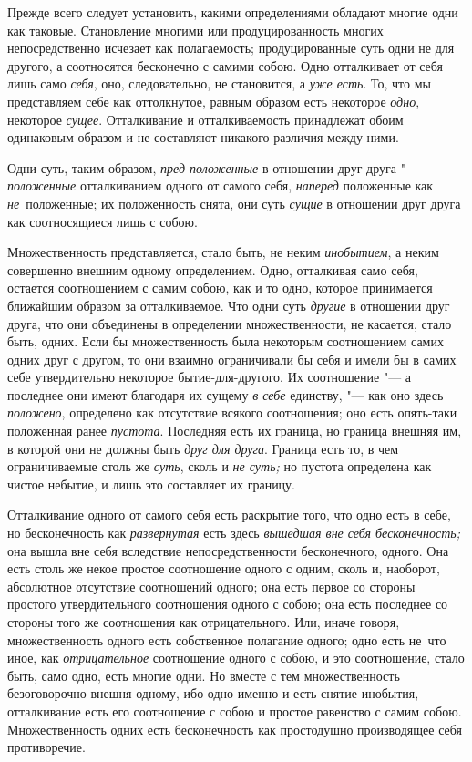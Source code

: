 Прежде всего следует установить, какими определениями обладают многие одни
как таковые. Становление многими или продуцированность многих
непосредственно исчезает как полагаемость; продуцированные суть одни не для
другого, а соотносятся бесконечно с самими собою. Одно отталкивает от себя
лишь само {\em себя}, оно, следовательно, не
становится, а {\em уже есть}. То, что мы представляем
себе как оттолкнутое, равным образом есть некоторое
{\em одно}, некоторое {\em сущее}.
Отталкивание и отталкиваемость принадлежат обоим одинаковым образом и не
составляют никакого различия между ними.

Одни суть, таким образом, {\em пред-положенные} в
отношении друг друга "--- {\em положенные} отталкиванием
одного от самого себя, {\em наперед} положенные как
{\em не}~положенные; их положенность снята, они суть
{\em сущие} в отношении друг друга как соотносящиеся лишь с собою.

Множественность представляется, стало быть, не неким
{\em инобытием}, а неким совершенно внешним одному
определением. Одно, отталкивая само себя, остается соотношением с самим
собою, как и то одно, которое принимается ближайшим образом за
отталкиваемое. Что одни суть {\em другие} в отношении
друг друга, что они объединены в определении множественности, не касается,
стало быть, одних. Если бы множественность была некоторым соотношением
самих одних друг с другом, то они взаимно ограничивали бы себя и имели бы в
самих себе утвердительно некоторое бытие-для-другого. Их соотношение "--- а
последнее они имеют благодаря их сущему {\em в себе}
единству, "--- как оно здесь {\em положено}, определено
как отсутствие всякого соотношения; оно есть опять-таки положенная ранее
{\em пустота}. Последняя есть их граница, но граница
внешняя им, в которой они не должны быть {\em друг для
друга}. Граница есть то, в чем ограничиваемые столь же
{\em суть}, сколь и {\em не суть;}
но пустота определена как чистое небытие, и лишь это составляет их границу.

Отталкивание одного от самого себя есть раскрытие того, что одно есть в
себе, но бесконечность как {\em развернутая} есть здесь
{\em вышедшая вне себя бесконечность;} она вышла вне
себя вследствие непосредственности бесконечного, одного. Она есть столь же
некое простое соотношение одного с одним, сколь и, наоборот, абсолютное
отсутствие соотношений одного; она есть первое со стороны простого
утвердительного соотношения одного с собою; она есть последнее со стороны
того же соотношения как отрицательного. Или, иначе говоря, множественность
одного есть собственное полагание одного; одно есть не~что иное, как
{\em отрицательное} соотношение одного с собою, и это
соотношение, стало быть, само одно, есть многие одни. Но вместе с тем
множественность безоговорочно внешня одному, ибо одно именно и есть снятие
инобытия, отталкивание есть его соотношение с собою и простое равенство с
самим собою. Множественность одних есть бесконечность как простодушно
производящее себя противоречие.

